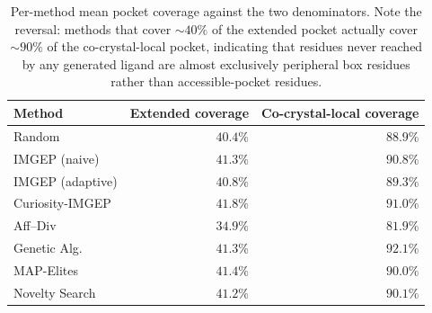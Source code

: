 \documentclass[journal=jcisd8,manuscript=suppinfo]{achemso}
\begin{document}
\begin{table}[ht]
\centering
\caption{Per-target pocket sizes. Extended = residues with $\geq 1$ atom inside the axis-aligned docking box (denominator used in the main text's ``Coverage'' column). Co-crystal-local = residues with $\geq 1$ heavy atom within $4.0$~\AA\ of any co-crystallized-ligand heavy atom (from the original PDB deposit, ligand identified as the largest non-cofactor HETATM residue).}
\label{tab:pockets}
\end{table}

\begin{table}[ht]
\centering
\caption{Per-method mean pocket coverage against the two denominators. Note the reversal: methods that cover $\sim 40\%$ of the extended pocket actually cover $\sim 90\%$ of the co-crystal-local pocket, indicating that residues never reached by any generated ligand are almost exclusively peripheral box residues rather than accessible-pocket residues.}
\label{tab:coverage_both}
\begin{tabular}{lrr}
\toprule
\textbf{Method} & \textbf{Extended coverage} & \textbf{Co-crystal-local coverage} \\
\midrule
Random           & $40.4\%$ & $88.9\%$ \\
IMGEP (naive)    & $41.3\%$ & $90.8\%$ \\
IMGEP (adaptive) & $40.8\%$ & $89.3\%$ \\
Curiosity-IMGEP  & $41.8\%$ & $91.0\%$ \\
Aff--Div         & $34.9\%$ & $81.9\%$ \\
Genetic Alg.     & $41.3\%$ & $92.1\%$ \\
MAP-Elites       & $41.4\%$ & $90.0\%$ \\
Novelty Search   & $41.2\%$ & $90.1\%$ \\
\bottomrule
\end{tabular}
\end{table}
\end{document}
